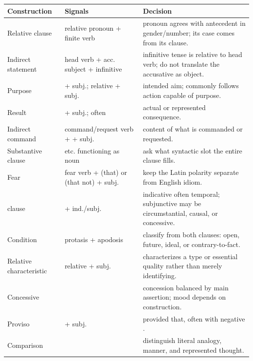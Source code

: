 \begin{xltabular}{\linewidth}{@{}P{1.55in}P{1.8in}Y@{}}
  \toprule
  \textbf{Construction} & \textbf{Signals} & \textbf{Decision} \\
  \midrule\endhead
  Relative clause & relative pronoun + finite verb & pronoun agrees with
       antecedent in gender/number; its case comes from its clause. \\
  Indirect statement & head verb + acc. subject + infinitive & infinitive tense
       is relative to head verb; do not translate the accusative as object. \\
  Purpose &  + subj.; relative + subj. & intended aim; commonly
       follows action capable of purpose. \\
  Result &  + subj.; often  &
       actual or represented consequence. \\
  Indirect command & command/request verb +  + subj. & content of
       what is commanded or requested. \\
  Substantive clause &  etc. functioning as noun & ask
       what syntactic slot the entire clause fills. \\
  Fear & fear verb +  (that) or  (that not) + subj. & keep
       the Latin polarity separate from English idiom. \\
   clause &  + ind./subj. & indicative often temporal;
       subjunctive may be circumstantial, causal, or concessive. \\
  Condition &  protasis + apodosis & classify from both clauses:
       open, future, ideal, or contrary-to-fact. \\
  Relative characteristic & relative + subj. & characterizes a type or
       essential quality rather than merely identifying. \\
  Concessive &  & concession balanced by main
       assertion; mood depends on construction. \\
  Proviso &  + subj. & provided that, often with
       negative . \\
  Comparison &  & distinguish literal analogy,
       manner, and represented thought. \\
  \bottomrule
\end{xltabular}


